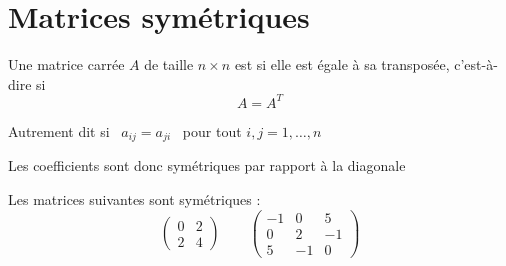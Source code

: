 \begin{frame}
% 
\end{frame}



\section{Matrices symétriques}

\begin{frame}
\begin{mydefinition}
Une matrice carrée $A$ de taille $n \times n$ est  si elle est égale 
à sa transposée, c'est-à-dire si
$$A = A^T$$ 



\end{mydefinition}
\pause
Autrement dit si \ $a_{ij}=a_{ji}$ \ pour tout $i,j=1, \ldots, n$

Les coefficients sont donc symétriques par rapport à la diagonale
\bigskip

\pause %
\begin{exemple} Les matrices suivantes sont symétriques :
 $$ \begin{pmatrix}
 0 & 2\\
 2 & 4\end{pmatrix} \qquad 
\begin{pmatrix}
 -1 & 0 & 5\\
 0 & 2 & -1\\
 5 & -1 & 0\end{pmatrix}
$$
\end{exemple} 
\end{frame}

